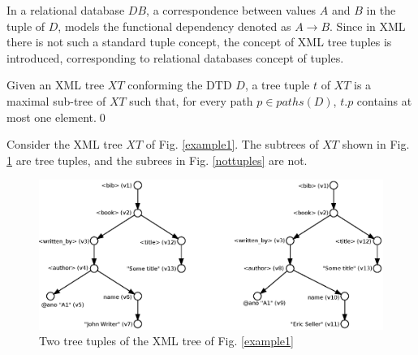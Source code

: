 In a relational database $DB$, a correspondence between values $A$ and $B$ in the tuple of $D$, models the functional dependency denoted as $A \rightarrow B$. Since in XML there is not such a standard tuple concept, the concept of XML tree tuples is introduced, corresponding to relational databases concept of tuples.

\begin{define}\label{treeTuple}
Given an XML tree $XT$ conforming the DTD $D$, a tree tuple $t$ of $XT$ is a maximal sub-tree of $XT$ such that, for every path $p \in paths(D)$, $t.p$ contains at most one element.\qed
\end{define}

\begin{example}
Consider the XML tree $XT$ of Fig. \ref{example1}. The subtrees of $XT$ shown in Fig. \ref{tuples} are tree tuples, and the subrees in Fig. \ref{nottuples} are not.

\begin{figure}[h]
    \centering\includegraphics[width=\textwidth]{tuples}
	\caption{Two tree tuples of the XML tree of Fig. \ref{example1}} \label{tuples}
\end{figure}


\end{example}
